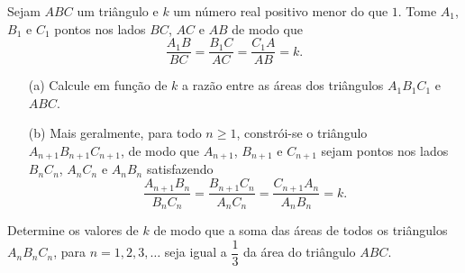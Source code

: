 Sejam $ABC$ um triângulo e $k$ um número real positivo menor do que $1$. Tome $A_1$, $B_1$ e $C_1$ pontos nos lados $BC$, $AC$ e $AB$ de modo que $$\frac{A_1B}{BC} = \frac{B_1C}{AC} = \frac{C_1A}{AB} = k.$$

\begin{itemize}
	\item[(a)] Calcule em função de $k$ a razão entre as áreas dos triângulos $A_1B_1C_1$ e $ABC$.
	\item[(b)] Mais geralmente, para todo $n \ge 1$, constrói-se o triângulo $A_{n+1}B_{n+1}C_{n+1}$, de modo que $A_{n+1}$, $B_{n+1}$ e $C_{n+1}$ sejam pontos nos lados $B_nC_n$, $A_nC_n$ e $A_nB_n$ satisfazendo $$\frac{A_{n+1}B_n}{B_nC_n} = \frac{B_{n+1}C_n}{A_nC_n} = \frac{C_{n+1}A_n}{A_nB_n} = k.$$
\end{itemize}

Determine os valores de $k$ de modo que a soma das áreas de todos os triângulos $A_nB_nC_n$, para $n = 1, 2, 3, \dots$ seja igual a $\dfrac{1}{3}$ da área do triângulo $ABC$.